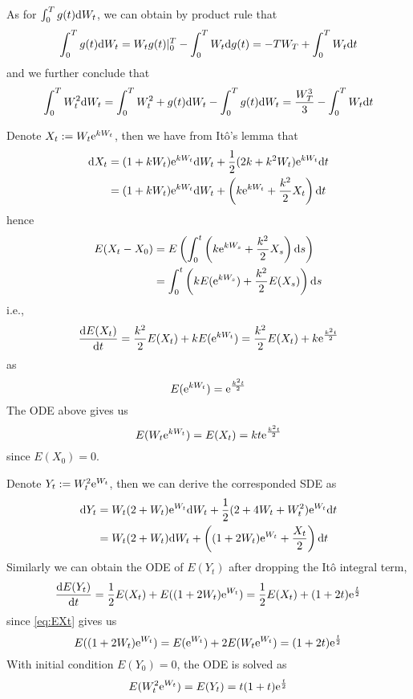 \documentclass{homework}
\begin{document}
    As for $\int_0^Tg(t)\mathrm d W_t$, we can obtain by product rule that
    \[\int_0^Tg(t)\mathrm d W_t=W_tg(t)|_0^T-\int_0^TW_t\mathrm d g(t)
    =-TW_T+\int_0^TW_t\mathrm d t\]
    and we further conclude that
    \[\int_0^TW_t^2\mathrm d W_t
    =\int_0^TW_t^2+g(t)\mathrm d W_t-\int_0^Tg(t)\mathrm d W_t
    =\frac{W_T^3}{3}-\int_0^TW_t\mathrm d t\]

    \problem
    Denote $X_t:=W_t\mathrm e^{kW_t}$, then we have from It\^o's lemma that
    \[\begin{aligned}
        \mathrm d X_t&=(1+kW_t)\mathrm e^{kW_t}\mathrm d W_t
        +\frac{1}{2}(2k+k^2W_t)\mathrm e^{kW_t}\mathrm d t\\
        &=(1+kW_t)\mathrm e^{kW_t}\mathrm d W_t+\left(k\mathrm e^{kW_t}+\frac{k^2}{2}X_t\right)\mathrm d t
    \end{aligned}\]
    hence
    \[\begin{aligned}
        E(X_t-X_0)&=E\left(\int_0^t\left(k\mathrm e^{kW_s}+\frac{k^2}{2}X_s\right)\mathrm d s\right)\\
        &=\int_0^t\left(kE(\mathrm e^{kW_s})+\frac{k^2}{2}E(X_s)\right)\mathrm d s
    \end{aligned}\]
    i.e.,
    \[\frac{\mathrm d E(X_t)}{\mathrm d t}=\frac{k^2}{2}E(X_t)+kE(\mathrm e^{kW_t})
    =\frac{k^2}{2}E(X_t)+k\mathrm e^{\frac{k^2t}{2}}\]
    as
    \[E(\mathrm e^{kW_t})=\mathrm e^{\frac{k^2t}{2}}\]
    The ODE above gives us
    \begin{equation}
        \label{eq:EXt}
        E(W_t\mathrm e^{kW_t})=E(X_t)=kt\mathrm e^{\frac{k^2t}{2}}
    \end{equation}
    since $E(X_0)=0$.

    Denote $Y_t:=W_t^2\mathrm e^{W_t}$, then we can derive the corresponded SDE as
    \[\begin{aligned}
        \mathrm d Y_t&=W_t(2+W_t)\mathrm e^{W_t}\mathrm d W_t+\frac{1}{2}(2+4W_t+W_t^2)\mathrm e^{W_t}\mathrm d t\\
        &=W_t(2+W_t)\mathrm d W_t+\left((1+2W_t)\mathrm e^{W_t}+\frac{X_t}{2}\right)\mathrm d t
    \end{aligned}\]
    Similarly we can obtain the ODE of $E(Y_t)$ after dropping the It\^o integral term,
    \[\frac{\mathrm d E(Y_t)}{\mathrm d t}=\frac{1}{2}E(X_t)+E((1+2W_t)\mathrm e^{W_t})
    =\frac{1}{2}E(X_t)+(1+2t)\mathrm e^{\frac{t}{2}}\]
    since \cref{eq:EXt} gives us
    \[E((1+2W_t)\mathrm e^{W_t})=E(\mathrm e^{W_t})+2E(W_t\mathrm e^{W_t})=(1+2t)\mathrm e^{\frac{t}{2}}\]
    With initial condition $E(Y_0)=0$, the ODE is solved as
    \[E(W_t^2\mathrm e^{W_t})=E(Y_t)=t(1+t)\mathrm e^{\frac{t}{2}}\]

    \problem
\end{document}
